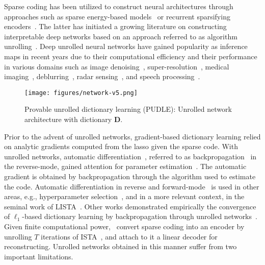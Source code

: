 \documentclass[10pt]{article} %
\newcommand{\D}{{\bm D}}
\begin{document}
Sparse coding has been utilized to construct neural architectures through approaches such as sparse energy-based models~\citep{ranzato2007sparsenergy, ranzato2008sparsedbn} or recurrent sparsifying encoders~\citep{gregor2010lista}. The latter has initiated a growing literature on constructing interpretable deep networks based on an approach referred to as algorithm unrolling~\citep{hershey2014unfold, monga2019algorithm}. Deep unrolled neural networks have gained popularity as inference maps in recent years due to their computational efficiency and their performance in various domains such as image denoising~\citep{simon2019rethinking, tolooshams2020tnnls, tolooshams2020icml}, super-resolution~\citep{wang2015supersparse}, medical imaging~\citep{solomon2020deepPCA}, deblurring~\citep{schuler2016deblur, li2020deblur}, radar sensing~\citep{tolooshams2021unfolding}, and speech processing~\citep{hershey2014unfold}.
%
\begin{figure}[t]
	\centering
	\texttt{[image: figures/network-v5.png]}
	\caption{Provable unrolled dictionary learning (PUDLE): Unrolled network architecture with dictionary $\D$.}
	\vspace{-4mm}
	\label{fig:network}
	\vspace{-2mm}
\end{figure}
%

Prior to the advent of unrolled networks, gradient-based dictionary learning relied on analytic gradients computed from the lasso given the sparse code. With unrolled networks, automatic differentiation~\citep{baydin2018automatic}, referred to as backpropagation~\citep{lecun2012efficient} in the reverse-mode, gained attention for parameter estimation~\citep{tolooshams2018mlsp}. The automatic gradient is obtained by backpropagation through the algorithm used to estimate the code. Automatic differentiation in reverse and forward-mode~\citep{franceschi2017forward} is used in other areas, e.g., hyperparameter selection~\citep{feurer2019hyperparameter}, and in a more relevant context, in the seminal work of LISTA~\citep{gregor2010lista}. Other works demonstrated empirically the convergence of $\ell_1$-based dictionary learning by backpropagation through unrolled networks~\citep{tolooshams2020tnnls}. Given finite computational power,~\citet{tolooshams2020tnnls} convert sparse coding into an encoder by unrolling $T$ iterations of ISTA~\citep{daubehies2004ista, blumensath2008ista}, and attach to it a linear decoder for reconstructing. Unrolled networks obtained in this manner suffer from two important limitations.
\end{document}
